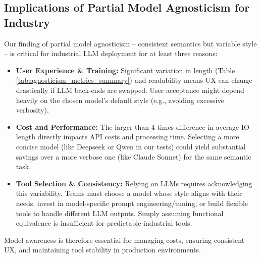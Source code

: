 \documentclass[conference]{IEEEtran}
\begin{document}
\subsection{Implications of Partial Model Agnosticism for Industry}
Our finding of partial model agnosticism – consistent semantics but variable style – is critical for industrial LLM deployment for at least three reasons:
\begin{itemize}
    \item \textbf{User Experience \& Training:} Significant variation in length (Table \ref{tab:agnosticism_metrics_summary}) and readability means UX can change drastically if LLM back-ends are swapped. User acceptance might depend heavily on the chosen model's default style (e.g., avoiding excessive verbosity).
    \item \textbf{Cost and Performance:} The larger than 4 times difference in average IO length directly impacts API costs and processing time. Selecting a more concise model (like Deepseek or Qwen in our tests) could yield substantial savings over a more verbose one (like Claude Sonnet) for the same semantic task.
    \item \textbf{Tool Selection \& Consistency:} Relying on LLMs requires acknowledging this variability. Teams must choose a model whose style aligns with their needs, invest in model-specific prompt engineering/tuning, or build flexible tools to handle different LLM outputs. Simply assuming functional equivalence is insufficient for predictable industrial tools.
\end{itemize}
Model awareness is therefore essential for managing costs, ensuring consistent UX, and maintaining tool stability in production environments.
\end{document}
